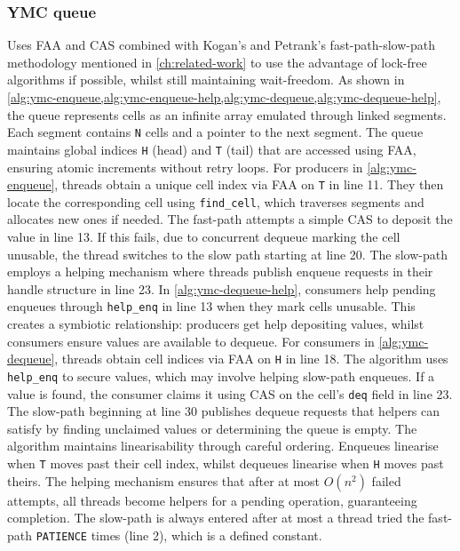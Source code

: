 \subsubsection{\ac{YMC} queue} 
Uses \ac{FAA} and \ac{CAS} combined with Kogan's and Petrank's fast-path-slow-path methodology mentioned in \cref{ch:related-work} to use the advantage of lock-free algorithms if possible, whilst still maintaining wait-freedom. As shown in \cref{alg:ymc-enqueue,alg:ymc-enqueue-help,alg:ymc-dequeue,alg:ymc-dequeue-help}, the queue represents cells as an infinite array emulated through linked segments. Each segment contains \texttt{N} cells and a pointer to the next segment. The queue maintains global indices \texttt{H} (head) and \texttt{T} (tail) that are accessed using \ac{FAA}, ensuring atomic increments without retry loops. For producers in \cref{alg:ymc-enqueue}, threads obtain a unique cell index via \ac{FAA} on \texttt{T} in line 11. They then locate the corresponding cell using \texttt{find\_cell}, which traverses segments and allocates new ones if needed. The fast-path attempts a simple \ac{CAS} to deposit the value in line 13. If this fails, due to concurrent dequeue marking the cell unusable, the thread switches to the slow path starting at line 20. The slow-path employs a helping mechanism where threads publish enqueue requests in their handle structure in line 23. In \cref{alg:ymc-dequeue-help}, consumers help pending enqueues through \texttt{help\_enq} in line 13 when they mark cells unusable. This creates a symbiotic relationship: producers get help depositing values, whilst consumers ensure values are available to dequeue. For consumers in \cref{alg:ymc-dequeue}, threads obtain cell indices via \ac{FAA} on \texttt{H} in line 18. The algorithm uses \texttt{help\_enq} to secure values, which may involve helping slow-path enqueues. If a value is found, the consumer claims it using \ac{CAS} on the cell's \texttt{deq} field in line 23. The slow-path beginning at line 30 publishes dequeue requests that helpers can satisfy by finding unclaimed values or determining the queue is empty. The algorithm maintains linearisability through careful ordering. Enqueues linearise when \texttt{T} moves past their cell index, whilst dequeues linearise when \texttt{H} moves past theirs. The helping mechanism ensures that after at most $O(n^2)$ failed attempts, all threads become helpers for a pending operation, guaranteeing completion. The slow-path is always entered after at most a thread tried the fast-path \texttt{PATIENCE} times (line 2), which is a defined constant. \cite{FastFetchAndAddWaitFreeQueue}

